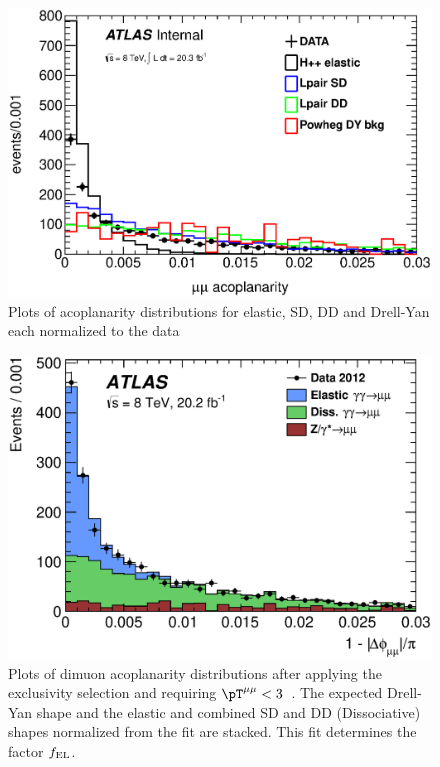 \begin{figure}[!h]                                                                 
\centering
\includegraphics[width=0.8\linewidth]{figures/shapes.eps}     
\caption{Plots of acoplanarity distributions for elastic, SD, DD and Drell-Yan
each normalized to the data}                                             
\label{fig:shapes}                        
\end{figure} %

\begin{figure}[!h]                                                                 
\centering
 \includegraphics[width=0.8\linewidth]{figures/dilepton_3shapes_Washington_filled.eps} 
 \caption{Plots of dimuon acoplanarity distributions after applying the
 exclusivity selection and requiring $\pT^{\mu\mu} < 3$~\GeV. The 
 expected Drell-Yan shape and the 
 elastic and combined SD and DD (Dissociative) shapes normalized from
 the fit are stacked. This fit 
          determines the factor $f_{\mathrm{EL}}$.}
 \label{fig:dilepAcoFit3Shape}
\end{figure}                                        

